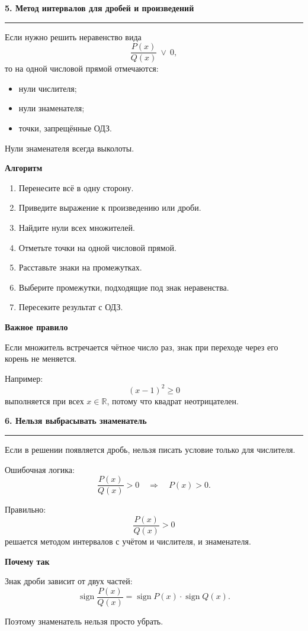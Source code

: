 \documentclass[a4paper,12pt]{article}
\newcommand{\SectionTitle}[1]{%
  \vspace{0.8em}
  {\Large\bfseries\textcolor{darkaccent}{#1}}\par
  \vspace{0.2em}
  {\color{accent}\rule{\linewidth}{0.8pt}}
  \vspace{0.4em}
}
\newcommand{\MiniTitle}[1]{%
  \vspace{0.45em}
  {\bfseries\textcolor{darkaccent}{#1}}\par
}
\begin{document}
\SectionTitle{5. Метод интервалов для дробей и произведений}

Если нужно решить неравенство вида
\[
\frac{P(x)}{Q(x)}\ \vee\ 0,
\]
то на одной числовой прямой отмечаются:

\begin{itemize}
\item нули числителя;
\item нули знаменателя;
\item точки, запрещённые ОДЗ.
\end{itemize}

Нули знаменателя всегда выколоты.

\MiniTitle{Алгоритм}

\begin{enumerate}
\item Перенесите всё в одну сторону.
\item Приведите выражение к произведению или дроби.
\item Найдите нули всех множителей.
\item Отметьте точки на одной числовой прямой.
\item Расставьте знаки на промежутках.
\item Выберите промежутки, подходящие под знак неравенства.
\item Пересеките результат с ОДЗ.
\end{enumerate}

\MiniTitle{Важное правило}

Если множитель встречается чётное число раз, знак при переходе через его корень не меняется.

Например:
\[
(x-1)^2\ge0
\]
выполняется при всех \(x\in\mathbb{R}\), потому что квадрат неотрицателен.

\SectionTitle{6. Нельзя выбрасывать знаменатель}

Если в решении появляется дробь, нельзя писать условие только для числителя.

Ошибочная логика:
\[
\frac{P(x)}{Q(x)}>0
\quad\Longrightarrow\quad
P(x)>0.
\]

Правильно:
\[
\frac{P(x)}{Q(x)}>0
\]
решается методом интервалов с учётом и числителя, и знаменателя.

\MiniTitle{Почему так}

Знак дроби зависит от двух частей:
\[
\operatorname{sign}\frac{P(x)}{Q(x)}
=
\operatorname{sign}P(x)\cdot\operatorname{sign}Q(x).
\]

Поэтому знаменатель нельзя просто убрать.
\end{document}
